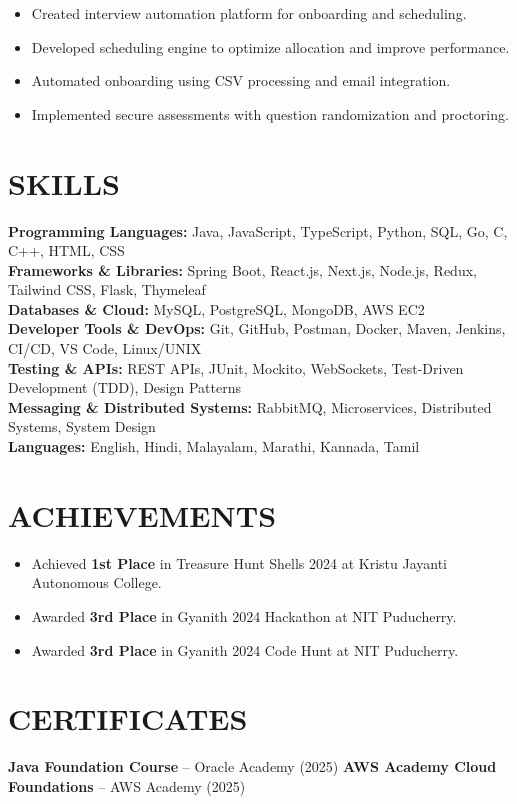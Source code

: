 \documentclass[10pt,a4paper]{article}
\begin{document}
\begin{itemize}

\item Created interview automation platform for onboarding and scheduling.

\item Developed scheduling engine to optimize allocation and improve performance.

\item Automated onboarding using CSV processing and email integration.

\item Implemented secure assessments with question randomization and proctoring.

\end{itemize}
\section*{SKILLS}

\small

\textbf{Programming Languages:}
Java, JavaScript, TypeScript, Python, SQL, Go, C, C++, HTML, CSS
\\[2pt]
\textbf{Frameworks \& Libraries:}
Spring Boot, React.js, Next.js, Node.js, Redux, Tailwind CSS, Flask, Thymeleaf
\\[2pt]
\textbf{Databases \& Cloud:}
MySQL, PostgreSQL, MongoDB, AWS EC2
\\[2pt]
\textbf{Developer Tools \& DevOps:}
Git, GitHub, Postman, Docker, Maven, Jenkins, CI/CD, VS Code, Linux/UNIX
\\[2pt]
\textbf{Testing \& APIs:}
REST APIs, JUnit, Mockito, WebSockets, Test-Driven Development (TDD), Design Patterns
\\[2pt]
\textbf{Messaging \& Distributed Systems:}
RabbitMQ, Microservices, Distributed Systems, System Design
\\[2pt]
\textbf{Languages:}
English, Hindi, Malayalam, Marathi, Kannada, Tamil


\section*{ACHIEVEMENTS}

\begin{itemize}

\item Achieved \textbf{1st Place} in Treasure Hunt Shells 2024 at Kristu Jayanti Autonomous College.

\item Awarded \textbf{3rd Place} in Gyanith 2024 Hackathon at NIT Puducherry.

\item Awarded \textbf{3rd Place} in Gyanith 2024 Code Hunt at NIT Puducherry.

\end{itemize}


\section*{CERTIFICATES}
\small
\textbf{Java Foundation Course} -- Oracle Academy (2025)
\hfill
\textbf{AWS Academy Cloud Foundations} -- AWS Academy (2025)
\end{document}
